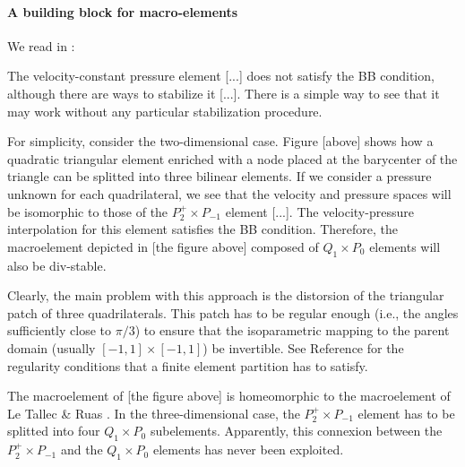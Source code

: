 \paragraph{A building block for macro-elements}

We read in \textcite{rovira1992}:
\begin{displayquote}
{\color{MidnightBlue}
The velocity-constant pressure element [...] does not satisfy the BB condition, although there
are ways to stabilize it [...]. There is a simple way to see that it may work without any particular 
stabilization procedure.}

\begin{center}
\end{center}


{\color{MidnightBlue}
For simplicity, consider the two-dimensional case. Figure [above] shows how a quadratic
triangular element enriched with a node placed at the barycenter of the triangle can
be splitted into three bilinear elements. If we consider a pressure unknown for each
quadrilateral, we see that the velocity and pressure spaces will be isomorphic to those
of the $P_2^+ \times P_{-1}$ element [...]. The velocity-pressure interpolation for this
element satisfies the BB condition. Therefore, the macroelement depicted in [the figure above]
composed of $Q_1 \times P_0$ elements will also be div-stable.

Clearly, the main problem with this approach is the distorsion of the triangular
patch of three quadrilaterals. This patch has to be regular enough (i.e., the angles
sufficiently close to $\pi/3$) to ensure that the isoparametric mapping to the parent domain
(usually $[-1,1] \times [-1,1]$) be invertible. See Reference \cite{ciarlet2002finite} 
for the regularity conditions that a finite element partition has to satisfy.

The macroelement of [the figure above] is homeomorphic to the macroelement of Le Tallec
\& Ruas \cite{leru86}.
In the three-dimensional case, the $P_2^+ \times P_{-1}$ 
element has to be splitted into four $Q_1 \times P_0$ subelements. 
Apparently, this connexion between the $P_2^+ \times P_{-1}$ and the $Q_1 \times P_0$
elements has never been exploited.}

\end{displayquote}

